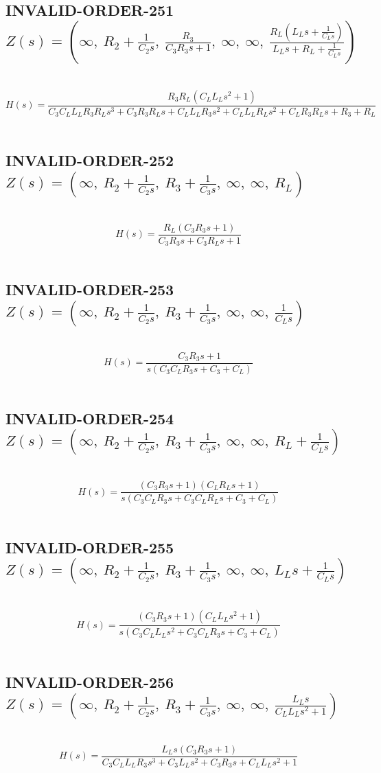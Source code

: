 \documentclass{article}
\begin{document}
\subsection{INVALID-ORDER-251 $Z(s) = \left( \infty, \  R_{2} + \frac{1}{C_{2} s}, \  \frac{R_{3}}{C_{3} R_{3} s + 1}, \  \infty, \  \infty, \  \frac{R_{L} \left(L_{L} s + \frac{1}{C_{L} s}\right)}{L_{L} s + R_{L} + \frac{1}{C_{L} s}}\right)$ } \ 
\textbf{\[H(s) = \frac{R_{3} R_{L} \left(C_{L} L_{L} s^{2} + 1\right)}{C_{3} C_{L} L_{L} R_{3} R_{L} s^{3} + C_{3} R_{3} R_{L} s + C_{L} L_{L} R_{3} s^{2} + C_{L} L_{L} R_{L} s^{2} + C_{L} R_{3} R_{L} s + R_{3} + R_{L}}\] } \ 
\subsection{INVALID-ORDER-252 $Z(s) = \left( \infty, \  R_{2} + \frac{1}{C_{2} s}, \  R_{3} + \frac{1}{C_{3} s}, \  \infty, \  \infty, \  R_{L}\right)$ } \ 
\textbf{\[H(s) = \frac{R_{L} \left(C_{3} R_{3} s + 1\right)}{C_{3} R_{3} s + C_{3} R_{L} s + 1}\] } \ 
\subsection{INVALID-ORDER-253 $Z(s) = \left( \infty, \  R_{2} + \frac{1}{C_{2} s}, \  R_{3} + \frac{1}{C_{3} s}, \  \infty, \  \infty, \  \frac{1}{C_{L} s}\right)$ } \ 
\textbf{\[H(s) = \frac{C_{3} R_{3} s + 1}{s \left(C_{3} C_{L} R_{3} s + C_{3} + C_{L}\right)}\] } \ 
\subsection{INVALID-ORDER-254 $Z(s) = \left( \infty, \  R_{2} + \frac{1}{C_{2} s}, \  R_{3} + \frac{1}{C_{3} s}, \  \infty, \  \infty, \  R_{L} + \frac{1}{C_{L} s}\right)$ } \ 
\textbf{\[H(s) = \frac{\left(C_{3} R_{3} s + 1\right) \left(C_{L} R_{L} s + 1\right)}{s \left(C_{3} C_{L} R_{3} s + C_{3} C_{L} R_{L} s + C_{3} + C_{L}\right)}\] } \ 
\subsection{INVALID-ORDER-255 $Z(s) = \left( \infty, \  R_{2} + \frac{1}{C_{2} s}, \  R_{3} + \frac{1}{C_{3} s}, \  \infty, \  \infty, \  L_{L} s + \frac{1}{C_{L} s}\right)$ } \ 
\textbf{\[H(s) = \frac{\left(C_{3} R_{3} s + 1\right) \left(C_{L} L_{L} s^{2} + 1\right)}{s \left(C_{3} C_{L} L_{L} s^{2} + C_{3} C_{L} R_{3} s + C_{3} + C_{L}\right)}\] } \ 
\subsection{INVALID-ORDER-256 $Z(s) = \left( \infty, \  R_{2} + \frac{1}{C_{2} s}, \  R_{3} + \frac{1}{C_{3} s}, \  \infty, \  \infty, \  \frac{L_{L} s}{C_{L} L_{L} s^{2} + 1}\right)$ } \ 
\textbf{\[H(s) = \frac{L_{L} s \left(C_{3} R_{3} s + 1\right)}{C_{3} C_{L} L_{L} R_{3} s^{3} + C_{3} L_{L} s^{2} + C_{3} R_{3} s + C_{L} L_{L} s^{2} + 1}\] } \ 
\end{document}
